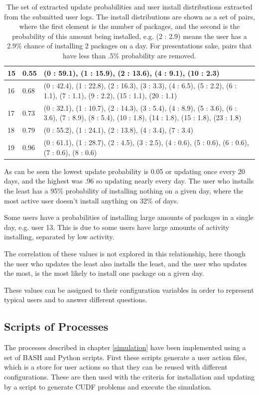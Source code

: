 \begin{table}
\begin{tabular}{|l|l ||  p{8.5cm}|}
15  &  0.55	 & 	(0 : 59.1), (1 : 15.9), (2 : 13.6), (4 : 9.1), (10 : 2.3)\\ \hline 
16  &  0.68	 & 	(0 : 42.4), (1 : 22.8), (2 : 16.3), (3 : 3.3), (4 : 6.5), (5 : 2.2), (6 : 1.1), (7 : 1.1), (9 : 2.2), (15 : 1.1), (20 : 1.1)\\ \hline 
17  &  0.73	 & 	(0 : 32.1), (1 : 10.7), (2 : 14.3), (3 : 5.4), (4 : 8.9), (5 : 3.6), (6 : 3.6), (7 : 8.9), (8 : 5.4), (10 : 1.8), (14 : 1.8), (15 : 1.8), (23 : 1.8)\\ \hline 
18  &  0.79	 & 	(0 : 55.2), (1 : 24.1), (2 : 13.8), (4 : 3.4), (7 : 3.4)\\ \hline 
19  &  0.96	 & 	(0 : 61.1), (1 : 28.7), (2 : 4.5), (3 : 2.5), (4 : 0.6), (5 : 0.6), (6 : 0.6), (7 : 0.6), (8 : 0.6)\\ \hline 

\end{tabular}
\caption[Extracted User Log Information]{The set of extracted update probabilities and user install distributions extracted from the submitted user logs.
The install distributions are shown as a set of pairs, where the first element is the number of packages, and the second is the probability of this amount being installed, 
e.g. (2 : 2.9) means the user has a 2.9\% chance of installing 2 packages on a day.
For presentations sake, pairs that have less than .5\% probability are removed.}
\label{userlogvariables}
\end{table}

As can be seen the lowest update probability is 0.05 or updating once every 20 days, and the highest was .96 so updating nearly every day.
The user who installs the least has a 95\% probability of installing nothing on a given day, where the most active user doesn't install anything on 32\% of days.

Some users have a probabilities of installing large amounts of packages in a single day, e.g. user 13.
This is due to some users have large amounts of activity installing, separated by low activity.

The correlation of these values is not explored in this relationship, here though the user who updates the least also installs the least,
and the user who updates the most, is the most likely to install one package on a given day.

These values can be assigned to their configuration variables in order to represent typical users and to answer different questions.

\subsection{Scripts of Processes}
The processes described in chapter \ref{simulation} have been implemented using a set of BASH and Python scripts.
First these scripts generate a user action files, which is a store for user actions so that they can be reused with different configurations.
These are then used with the criteria for installation and updating by a script to generate CUDF problems and execute the simulation.

